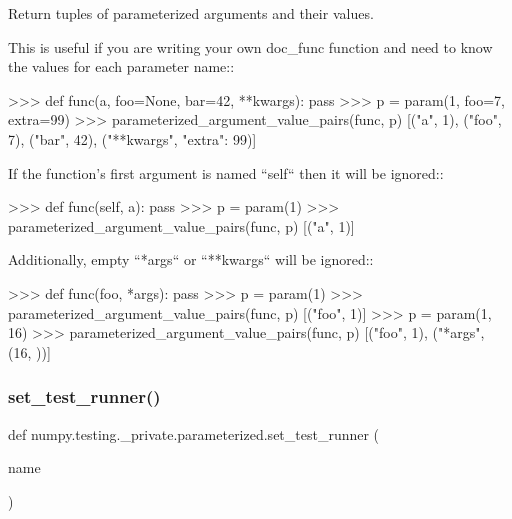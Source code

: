 \begin{DoxyVerb}Return tuples of parameterized arguments and their values.

    This is useful if you are writing your own doc_func
    function and need to know the values for each parameter name::

        >>> def func(a, foo=None, bar=42, **kwargs): pass
        >>> p = param(1, foo=7, extra=99)
        >>> parameterized_argument_value_pairs(func, p)
        [("a", 1), ("foo", 7), ("bar", 42), ("**kwargs", {"extra": 99})]

    If the function's first argument is named ``self`` then it will be
    ignored::

        >>> def func(self, a): pass
        >>> p = param(1)
        >>> parameterized_argument_value_pairs(func, p)
        [("a", 1)]

    Additionally, empty ``*args`` or ``**kwargs`` will be ignored::

        >>> def func(foo, *args): pass
        >>> p = param(1)
        >>> parameterized_argument_value_pairs(func, p)
        [("foo", 1)]
        >>> p = param(1, 16)
        >>> parameterized_argument_value_pairs(func, p)
        [("foo", 1), ("*args", (16, ))]
\end{DoxyVerb}
 \mbox{\label{namespacenumpy_1_1testing_1_1__private_1_1parameterized_ac7f594901632cbabf64628092a88acb9}} 
\subsubsection{\texorpdfstring{set\+\_\+test\+\_\+runner()}{set\_test\_runner()}}
{\footnotesize\ttfamily def numpy.\+testing.\+\_\+private.\+parameterized.\+set\+\_\+test\+\_\+runner (\begin{DoxyParamCaption}\item[{}]{name }\end{DoxyParamCaption})}

\mbox{\label{namespacenumpy_1_1testing_1_1__private_1_1parameterized_afdf47621e356527a1b69af42f9722c60}} 
